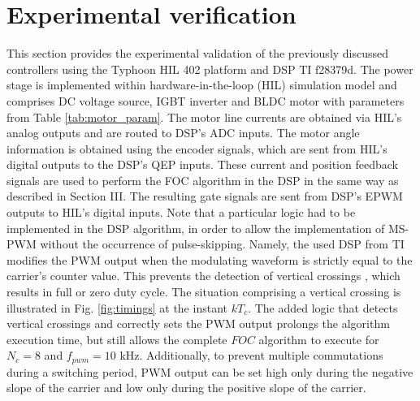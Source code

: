 \documentclass[conference]{IEEEtran}
\begin{document}
\section{Experimental verification}
This section provides the experimental validation of the previously discussed controllers using the Typhoon HIL 402 platform and DSP TI f28379d. The power stage is implemented within hardware-in-the-loop (HIL) simulation model and comprises DC voltage source, IGBT inverter and BLDC motor with parameters from Table \ref{tab:motor_param}. The motor line currents are obtained via HIL’s analog outputs and are routed to DSP's ADC inputs. The motor angle information is obtained using the encoder signals, which are sent from HIL’s digital outputs to the DSP's QEP inputs. These current and position feedback signals are used to perform the FOC algorithm in the DSP in the same way as described in Section III. The resulting gate signals are sent from DSP’s EPWM outputs to HIL's digital inputs. 
Note that a particular logic had to be implemented in the DSP algorithm, in order to allow the implementation of MS-PWM without the occurrence of pulse-skipping. Namely, the used DSP from TI modifies the PWM output when the modulating waveform is strictly equal to the carrier's counter value. This prevents the detection of vertical crossings \cite{corradini2018}, which results in full or zero duty cycle. The situation comprising a vertical crossing is illustrated in Fig. \ref{fig:timings} at the instant $kT_c$.
The added logic that detects vertical crossings and correctly sets the PWM output prolongs the algorithm execution time, but still allows the complete $FOC$ algorithm to execute for $N_c=8$ and $f_{pwm} = 10$ kHz. Additionally, to prevent multiple commutations during a switching period, PWM output can be set high only during the negative slope of the carrier and low only during the positive slope of the carrier.
\end{document}
